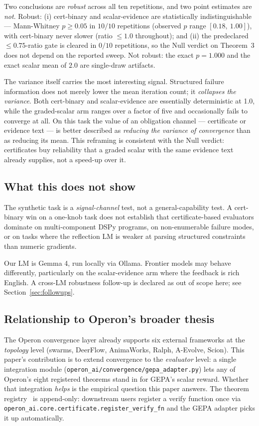 Two conclusions are \emph{robust} across all ten repetitions, and
two point estimates are \emph{not}.  Robust: (i) cert-binary and
scalar-evidence are statistically indistinguishable --- Mann-Whitney
$p \ge 0.05$ in $10/10$ repetitions (observed $p$ range
$[0.18,~1.00]$), with cert-binary never slower (ratio $\le 1.0$
throughout); and (ii) the predeclared $\le 0.75$-ratio gate is
cleared in $0/10$ repetitions, so the Null verdict on Theorem~3 does
not depend on the reported sweep.  Not robust: the exact $p=1.000$
and the exact scalar mean of $2.0$ are single-draw artifacts.

The variance itself carries the most interesting signal.  Structured
failure information does not merely lower the mean iteration count;
it \emph{collapses the variance}.  Both cert-binary and
scalar-evidence are essentially deterministic at 1.0, while the
graded-scalar arm ranges over a factor of five and occasionally
fails to converge at all.  On this task the value of an obligation
channel --- certificate or evidence text --- is better described as
\emph{reducing the variance of convergence} than as reducing its
mean.  This reframing is consistent with the Null verdict: certificates
buy reliability that a graded scalar with the same evidence text
already supplies, not a speed-up over it.

\subsection{What this does not show}

The synthetic task is a \emph{signal-channel} test, not a
general-capability test.  A cert-binary win on a one-knob task does
not establish that certificate-based evaluators dominate on
multi-component DSPy programs, on non-enumerable failure modes, or
on tasks where the reflection LM is weaker at parsing structured
constraints than numeric gradients.

Our LM is Gemma 4, run locally via Ollama.  Frontier models may
behave differently, particularly on the scalar-evidence arm where
the feedback is rich English.  A cross-LM robustness follow-up is
declared as out of scope here; see Section~\ref{sec:followups}.

\subsection{Relationship to Operon's broader thesis}\label{sec:thesis}

The Operon convergence layer already supports six external
frameworks at the \emph{topology} level (swarms, DeerFlow,
AnimaWorks, Ralph, A-Evolve, Scion).  This paper's contribution is
to extend convergence to the \emph{evaluator} level: a single
integration module (\texttt{operon\_ai/convergence/gepa\_adapter.py})
lets any of Operon's eight registered theorems stand in for
GEPA's scalar reward.  Whether that integration \emph{helps} is the
empirical question this paper answers.  The theorem
registry~\cite{banu2026operon} is append-only: downstream users register a
verify function once via
\texttt{operon\_ai.core.certificate.register\_verify\_fn} and the
GEPA adapter picks it up automatically.
